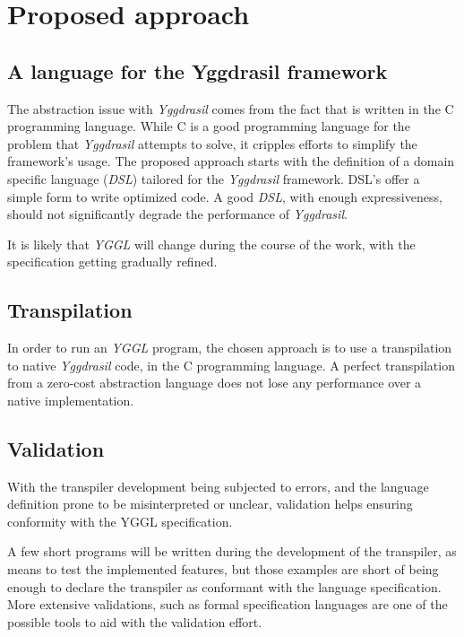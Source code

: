 \documentclass[runningheads]{llncs}
\begin{document}
\section{Proposed approach}
\label{proposed}
\subsection{A language for the Yggdrasil framework}
The abstraction issue with \textit{Yggdrasil} comes from the fact that is written in the C programming language. While C is a good programming language for the problem that \textit{Yggdrasil} attempts to solve, it cripples efforts to simplify the framework's usage.
The proposed approach starts with the definition of a domain specific language (\textit{DSL}) tailored for the \textit{Yggdrasil} framework.
DSL's offer a simple form to write optimized code. A good \textit{DSL}, with enough expressiveness, should not significantly degrade the performance of \textit{Yggdrasil}.
\par It is likely that \textit{YGGL} will change during the course of the work, with the specification getting gradually refined.
\subsection{Transpilation}
In order to run an \textit{YGGL} program, the chosen approach is to use a transpilation to native \textit{Yggdrasil} code, in the C programming language.
A perfect transpilation from a zero-cost abstraction language does not lose any performance over a native implementation.
\subsection{Validation}
With the transpiler development being subjected to errors, and the language definition prone to be misinterpreted or unclear, validation helps ensuring conformity with the YGGL specification.
\par A few short programs will be written during the development of the transpiler, as means to test the implemented features, but those examples are short of being enough to declare the transpiler as conformant with the language specification. More extensive validations, such as formal specification languages are one of the possible tools to aid with the validation effort.
\end{document}
